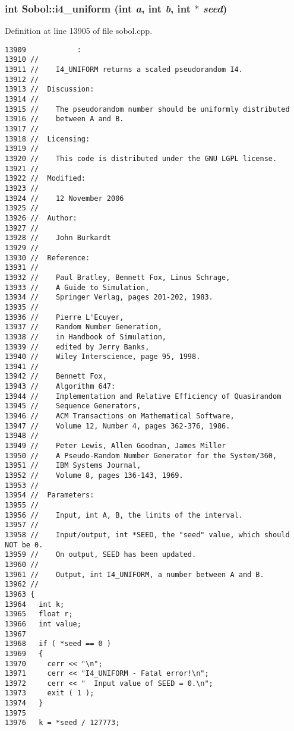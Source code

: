 \subsubsection{\setlength{\rightskip}{0pt plus 5cm}int Sobol::i4\_\-uniform (int {\em a}, int {\em b}, int $\ast$ {\em seed})}\label{namespaceSobol_e0cc8cf911c36d5d9c5f437af4e91927}




Definition at line 13905 of file sobol.cpp.

\begin{Code}\begin{verbatim}13909            :
13910 //
13911 //    I4_UNIFORM returns a scaled pseudorandom I4.
13912 //
13913 //  Discussion:
13914 //
13915 //    The pseudorandom number should be uniformly distributed
13916 //    between A and B.
13917 //
13918 //  Licensing:
13919 //
13920 //    This code is distributed under the GNU LGPL license. 
13921 //
13922 //  Modified:
13923 //
13924 //    12 November 2006
13925 //
13926 //  Author:
13927 //
13928 //    John Burkardt
13929 //
13930 //  Reference:
13931 //
13932 //    Paul Bratley, Bennett Fox, Linus Schrage,
13933 //    A Guide to Simulation,
13934 //    Springer Verlag, pages 201-202, 1983.
13935 //
13936 //    Pierre L'Ecuyer,
13937 //    Random Number Generation,
13938 //    in Handbook of Simulation,
13939 //    edited by Jerry Banks,
13940 //    Wiley Interscience, page 95, 1998.
13941 //
13942 //    Bennett Fox,
13943 //    Algorithm 647:
13944 //    Implementation and Relative Efficiency of Quasirandom
13945 //    Sequence Generators,
13946 //    ACM Transactions on Mathematical Software,
13947 //    Volume 12, Number 4, pages 362-376, 1986.
13948 //
13949 //    Peter Lewis, Allen Goodman, James Miller
13950 //    A Pseudo-Random Number Generator for the System/360,
13951 //    IBM Systems Journal,
13952 //    Volume 8, pages 136-143, 1969.
13953 //
13954 //  Parameters:
13955 //
13956 //    Input, int A, B, the limits of the interval.
13957 //
13958 //    Input/output, int *SEED, the "seed" value, which should NOT be 0.
13959 //    On output, SEED has been updated.
13960 //
13961 //    Output, int I4_UNIFORM, a number between A and B.
13962 //
13963 {
13964   int k;
13965   float r;
13966   int value;
13967 
13968   if ( *seed == 0 )
13969   {
13970     cerr << "\n";
13971     cerr << "I4_UNIFORM - Fatal error!\n";
13972     cerr << "  Input value of SEED = 0.\n";
13973     exit ( 1 );
13974   }
13975 
13976   k = *seed / 127773;

\end{verbatim}
\end{Code}

